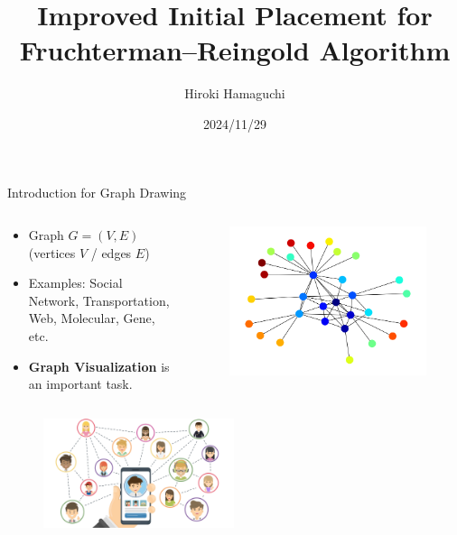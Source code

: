 \documentclass[13pt,aspectratio=169,table,dvipdfmx]{beamer}
\title{\Huge{Improved Initial Placement for\\Fruchterman--Reingold Algorithm}}
\author{\Large{Hiroki Hamaguchi}}
\institute{\large{Supervisors: Prof. Akiko Takeda}}
\date{2024/11/29}
\newif\ifShowHidden
\begin{document}
\ifShowHidden
  \maketitle
\fi

\begin{frame}{Introduction for Graph Drawing}
  \begin{columns}
    \begin{column}{0.59\columnwidth}
      \begin{itemize}
        \item Graph $G = (V,E)$ (vertices $V$  / edges $E$)
        \item Examples: Social Network, Transportation, Web, Molecular, Gene, etc.
        \item \textbf{Graph Visualization} is an important task.
      \end{itemize}
    \end{column}
    \begin{column}{0.39\columnwidth}
      \begin{figure}[htbp]
        \centering
        \includegraphics[width=0.75\columnwidth]{imgs/example_fr.png}
      \end{figure}
    \end{column}
  \end{columns}
  \begin{figure}[htbp]
    \begin{minipage}{0.49\columnwidth}
      \centering
      \includegraphics[height=32mm]{imgs/graph_social.jpg}

\end{minipage}
\end{figure}
\end{frame}
\end{document}
